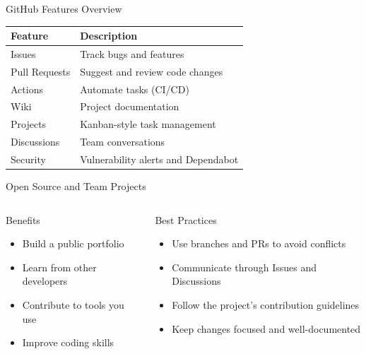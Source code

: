 \documentclass[aspectratio=169]{beamer}
\begin{document}
\begin{frame}{GitHub Features Overview}
  \begin{center}
    \begin{tabular}{ll}
      \textbf{Feature} & \textbf{Description} \\ \hline
      Issues & Track bugs and features \\
      Pull Requests & Suggest and review code changes \\
      Actions & Automate tasks (CI/CD) \\
      Wiki & Project documentation \\
      Projects & Kanban-style task management \\
      Discussions & Team conversations \\
      Security & Vulnerability alerts and Dependabot
    \end{tabular}
  \end{center}
\end{frame}

\begin{frame}{Open Source and Team Projects}
  \begin{columns}
    \begin{column}{0.48\textwidth}
      \begin{block}{Benefits}
        \begin{itemize}
          \item Build a public portfolio
          \item Learn from other developers
          \item Contribute to tools you use
          \item Improve coding skills
        \end{itemize}
      \end{block}
    \end{column}
    
    \begin{column}{0.48\textwidth}
      \begin{block}{Best Practices}
        \begin{itemize}
          
          \item Use branches and PRs to avoid conflicts
          \item Communicate through Issues and Discussions
          \item Follow the project's contribution guidelines
          \item Keep changes focused and well-documented
        \end{itemize}
      \end{block}
    \end{column}
  \end{columns}
\end{frame}
\end{document}
